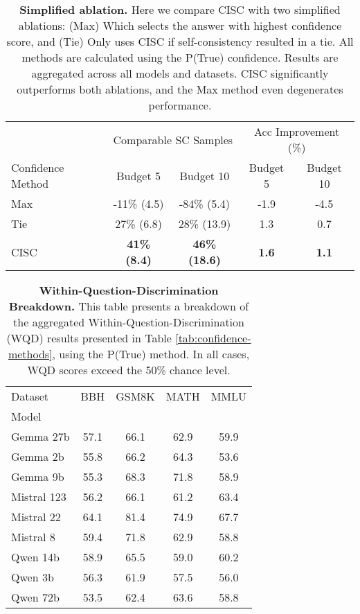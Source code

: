 \begin{table*}[!ht]
\centering
\begin{tabular}{lcccc}
\toprule
& \multicolumn{2}{c}{Comparable SC Samples} & \multicolumn{2}{c}{Acc Improvement (\%)} \\
\cmidrule(lr){2-3} \cmidrule(lr){4-5}
Confidence Method & Budget 5 & Budget 10 & Budget 5 & Budget 10 \\
\midrule
Max & -11\% \small{(4.5)} & -84\% \small{(5.4)} & -1.9 & -4.5 \\[4pt]
Tie & 27\% \small{(6.8)} & 28\% \small{(13.9)} & 1.3 & 0.7 \\[4pt]
CISC & \textbf{41\% \small{(8.4)}} & \textbf{46\% \small{(18.6)}} & \textbf{1.6} & \textbf{1.1} \\[4pt]

\bottomrule
\end{tabular}
\caption{\textbf{Simplified ablation. } Here we compare CISC with two simplified ablations:  (Max) Which selects the answer with highest confidence score, and (Tie) Only uses CISC if self-consistency resulted in a tie. All methods are calculated using the P(True) confidence. Results are aggregated across all models and datasets. CISC significantly outperforms both ablations, and the Max method even degenerates performance.}
\label{table:max-ablation}
\end{table*}

\begin{table*}[!h]
\centering
\begin{tabular}{lcccc}
\toprule
Dataset & BBH & GSM8K & MATH & MMLU \\
Model &  &  &  &  \\
\midrule
Gemma 27b & 57.1 & 66.1 & 62.9 & 59.9 \\
Gemma 2b & 55.8 & 66.2 & 64.3 & 53.6 \\
Gemma 9b & 55.3 & 68.3 & 71.8 & 58.9 \\
Mistral 123 & 56.2 & 66.1 & 61.2 & 63.4 \\
Mistral 22 & 64.1 & 81.4 & 74.9 & 67.7 \\
Mistral 8 & 59.4 & 71.8 & 62.9 & 58.8 \\
Qwen 14b & 58.9 & 65.5 & 59.0 & 60.2 \\
Qwen 3b & 56.3 & 61.9 & 57.5 & 56.0 \\
Qwen 72b & 53.5 & 62.4 & 63.6 & 58.8 \\
\bottomrule
\end{tabular}
\label{table:wqd-breakdown}
\caption{\textbf{Within-Question-Discrimination Breakdown.} This table presents a breakdown of the aggregated Within-Question-Discrimination (WQD) results presented in Table \ref{tab:confidence-methods}, using the P(True) method.  In all cases, WQD scores exceed the 50\% chance level. 
}
\end{table*}
